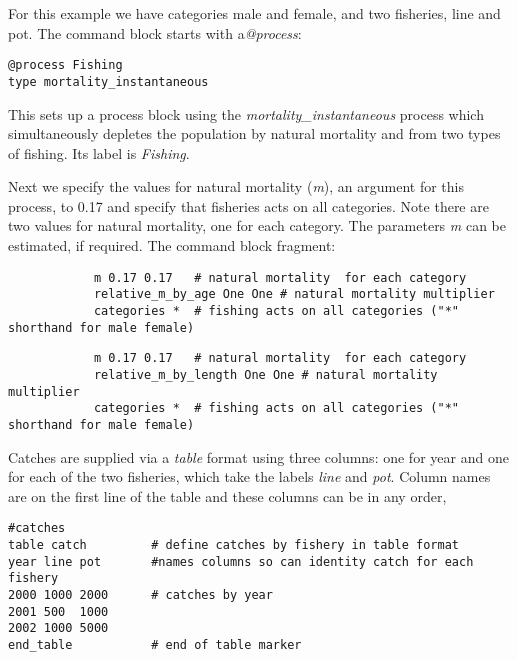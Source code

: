 For this example we have categories male and female, and two fisheries, line and pot. The command block starts with a\textit{@process}:

{\small{\begin{verbatim}
@process Fishing
type mortality_instantaneous
\end{verbatim}}}

This sets up a process block using the \textit{mortality\_instantaneous} process which simultaneously depletes the population by natural mortality and from two types of fishing. Its label is \textit{Fishing}.

Next we specify the values for natural mortality (\textit{m}), an argument for this process, to 0.17 and specify that fisheries acts on all categories. Note there are two values for natural mortality, one for each category. The parameters \textit{m} can be estimated, if required. The command block fragment:

\ifAgeBased 
{\small{\begin{verbatim}
			m 0.17 0.17   # natural mortality  for each category
			relative_m_by_age One One # natural mortality multiplier
			categories *  # fishing acts on all categories ("*" shorthand for male female)
\end{verbatim}}}
\else 
{\small{\begin{verbatim}
			m 0.17 0.17   # natural mortality  for each category
			relative_m_by_length One One # natural mortality multiplier
			categories *  # fishing acts on all categories ("*" shorthand for male female)
\end{verbatim}}}
\fi

Catches are supplied via a \textit{table} format using three columns: one for year and one for each of the two fisheries, which take the labels \textit{line} and \textit{pot}. Column names are on the first line of the table and these columns can be in any order,

{\small{\begin{verbatim}
#catches
table catch         # define catches by fishery in table format
year line pot       #names columns so can identity catch for each fishery
2000 1000 2000      # catches by year
2001 500  1000
2002 1000 5000
end_table           # end of table marker
\end{verbatim}}}

